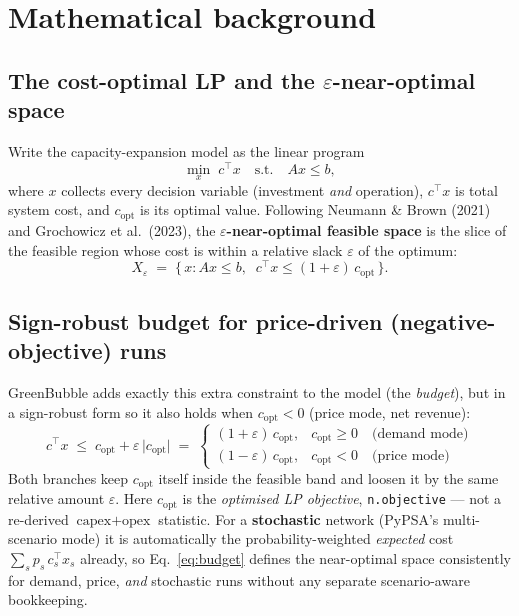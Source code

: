 \documentclass[11pt]{article}
\begin{document}
\section{Mathematical background}

\subsection{The cost-optimal LP and the $\varepsilon$-near-optimal space}
Write the capacity-expansion model as the linear program
\begin{equation}
  \min_{x}\; c^\top x \quad \text{s.t.} \quad Ax \le b,
\end{equation}
where $x$ collects every decision variable (investment \emph{and}
operation), $c^\top x$ is total system cost, and $c_{\mathrm{opt}}$ is its
optimal value. Following Neumann \& Brown (2021) and Grochowicz et al.\
(2023), the \textbf{$\varepsilon$-near-optimal feasible space} is the slice
of the feasible region whose cost is within a relative slack $\varepsilon$
of the optimum:
\begin{equation}
  X_\varepsilon \;=\; \bigl\{\, x : Ax \le b,\;\; c^\top x \le
  (1+\varepsilon)\, c_{\mathrm{opt}} \,\bigr\}.
\end{equation}

\subsection{Sign-robust budget for price-driven (negative-objective) runs}
\label{sec:budget}
GreenBubble adds exactly this extra constraint to the model (the
\emph{budget}), but in a sign-robust form so it also holds when
$c_{\mathrm{opt}} < 0$ (price mode, net revenue):
\begin{equation}
  c^\top x \;\le\; c_{\mathrm{opt}} + \varepsilon\,\lvert c_{\mathrm{opt}}
  \rvert
  \;=\;
  \begin{cases}
    (1+\varepsilon)\, c_{\mathrm{opt}}, & c_{\mathrm{opt}} \ge 0
      \quad \text{(demand mode)} \\[2pt]
    (1-\varepsilon)\, c_{\mathrm{opt}}, & c_{\mathrm{opt}} < 0
      \quad \text{(price mode)}
  \end{cases}
  \label{eq:budget}
\end{equation}
Both branches keep $c_{\mathrm{opt}}$ itself inside the feasible band and
loosen it by the same relative amount $\varepsilon$. Here $c_{\mathrm{opt}}$
is the \emph{optimised LP objective}, \texttt{n.objective} --- not a
re-derived $\text{capex}+\text{opex}$ statistic. For a \textbf{stochastic}
network (PyPSA's multi-scenario mode) it is automatically the
probability-weighted \emph{expected} cost $\sum_s p_s\, c_s^\top x_s$
already, so Eq.~\eqref{eq:budget} defines the near-optimal space
consistently for demand, price, \emph{and} stochastic runs without any
separate scenario-aware bookkeeping.
\end{document}
